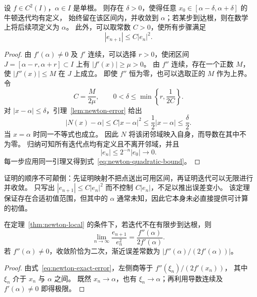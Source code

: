 \documentclass[UTF8,12pt,a4paper,fontset=fandol]{ctexart}
\begin{document}
\begin{theorem}[局部收敛]\label{thm:newton-local}
设 $f\in C^2(I)$，$\alpha\in I$ 是单根。
则存在 $\delta>0$，使得任意 $x_0\in[\alpha-\delta,\alpha+\delta]$ 的牛顿迭代均有定义，
始终留在该区间内，并收敛到 $\alpha$；若某步到达根，则在数学上将后续项定义为 $\alpha$。
此外，可以取常数 $C>0$，使所有步骤满足
\begin{equation}\label{eq:newton-quadratic-bound}
  |e_{n+1}|\le C|e_n|^2.
\end{equation}
\end{theorem}

\begin{proof}
由 $f'(\alpha)\ne0$ 及 $f'$ 连续，可以选择 $r>0$，使闭区间
$J=[\alpha-r,\alpha+r]\subset I$ 上有 $|f'(x)|\ge\mu>0$。
由 $f''$ 连续，存在一个正数 $M$，使 $|f''(x)|\le M$ 在 $J$ 上成立。
即使 $f''$ 恒为零，也可以选取正的 $M$ 作为上界。令
\[
  C=\frac{M}{2\mu},\qquad
  0<\delta\le\min\left\{r,\frac{1}{2C}\right\}.
\]
对 $|x-\alpha|\le\delta$，引理~\ref{lem:newton-error} 给出
\[
  |N(x)-\alpha|\le C|x-\alpha|^2
     \le\frac12|x-\alpha|\le\frac\delta2.
\]
当 $x=\alpha$ 时同一不等式也成立。
因此 $N$ 将该闭邻域映入自身，而导数在其中不为零。
归纳可知所有迭代点均有定义且不离开邻域，并且
\[
  |e_n|\le2^{-n}|e_0|\longrightarrow0.
\]
每一步应用同一引理又得到式~\eqref{eq:newton-quadratic-bound}。
\end{proof}

证明的顺序不可颠倒：先证明映射不把点送出可用区间，再证明迭代可以无限进行并收敛。
只写出 $|e_{n+1}|\le C|e_n|^2$ 而不控制 $C|e_n|$，不足以推出误差变小。
该定理保证存在合适初值范围，但其中的 $\alpha$ 通常未知，因此它本身未必直接提供可计算的初值。

\begin{corollary}[渐近误差常数]\label{cor:newton-asymptotic}
在定理~\ref{thm:newton-local} 的条件下，若迭代不在有限步到达根，则
\begin{equation}\label{eq:newton-asymptotic}
  \lim_{n\to\infty}\frac{e_{n+1}}{e_n^2}
    =\frac{f''(\alpha)}{2f'(\alpha)}.
\end{equation}
若 $f''(\alpha)\ne0$，收敛阶恰为二次，渐近误差常数为
$|f''(\alpha)/(2f'(\alpha))|$。
\end{corollary}

\begin{proof}
由式~\eqref{eq:newton-exact-error}，左侧商等于 $f''(\xi_n)/(2f'(x_n))$，
其中 $\xi_n$ 介于 $x_n$ 与 $\alpha$ 之间。
既然 $x_n\to\alpha$，也有 $\xi_n\to\alpha$；再利用导数连续及 $f'(\alpha)\ne0$ 即得极限。
\end{proof}
\end{document}
